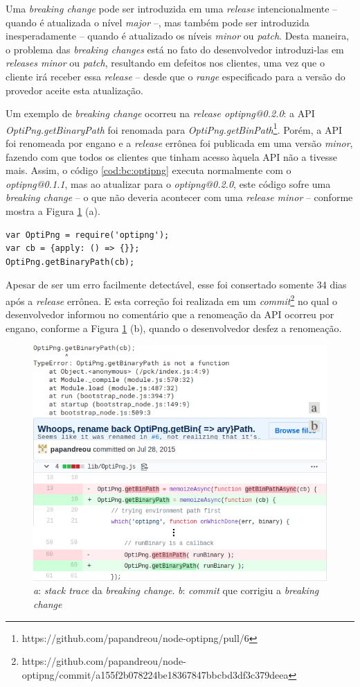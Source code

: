 Uma \textit{breaking change} pode ser introduzida em uma \textit{release} intencionalmente -- quando é atualizada o nível \textit{major} --, mas também pode ser introduzida inesperadamente -- quando é atualizado os níveis \textit{minor} ou \textit{patch}. Desta maneira, o problema das \textit{breaking changes} está no fato do desenvolvedor introduzi-las em \textit{releases minor} ou \textit{patch}, resultando em defeitos nos clientes, uma vez que o cliente irá receber essa \textit{release} -- desde que o \textit{range} especificado para a versão do provedor aceite esta atualização.

Um exemplo de \textit{breaking change} ocorreu na \textit{release optipng@0.2.0}: a \gls{API} \textit{OptiPng.getBinaryPath} foi renomada para \textit{OptiPng.getBinPath}\footnote{https://github.com/papandreou/node-optipng/pull/6}. Porém, a \gls{API} foi renomeada por engano e a \textit{release} errônea foi publicada em uma versão \textit{minor}, fazendo com que todos os clientes que tinham acesso àquela \gls{API} não a tivesse mais. Assim, o código \ref{cod:bc:optipng} executa normalmente com o \textit{optipng@0.1.1}, mas ao atualizar para o \textit{optipng@0.2.0}, este código sofre uma \textit{breaking change} -- o que não deveria acontecer com uma \textit{release minor}  -- conforme mostra a Figura \ref{fig:bc_optipng} (a).

\begin{lstlisting}[style=Javascript, label=cod:bc:optipng, caption={Código que sofre \textit{breaking change} do \textit{optipng}}]
var OptiPng = require('optipng');
var cb = {apply: () => {}};
OptiPng.getBinaryPath(cb);
\end{lstlisting}

Apesar de ser um erro facilmente detectável, esse foi consertado somente 34 dias após a \textit{release} errônea. E esta correção foi realizada em um \textit{commit}\footnote{https://github.com/papandreou/node-optipng/commit/a155f2b078224be18367847bbcbd3df3c379deea} no qual o desenvolvedor informou no comentário que a renomeação da \gls{API} ocorreu por engano, conforme a Figura \ref{fig:bc_optipng} (b), quando o desenvolvedor desfez a renomeação.

\begin{figure}
    \centering
    \includegraphics[scale=0.65]{figuras/bc_optipng.png}
    \caption{\textit{a}: \textit{stack trace} da \textit{breaking change}. \textit{b}: \textit{commit} que corrigiu a \textit{breaking change}}
    \label{fig:bc_optipng}
\end{figure}{}